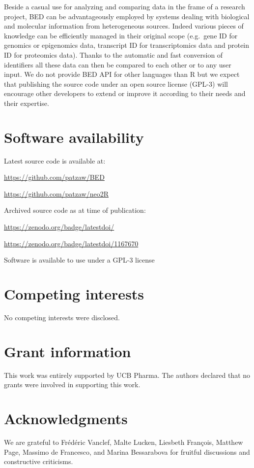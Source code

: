 \documentclass[9pt,a4paper,]{extarticle}
\theoremstyle{definition}
\theoremstyle{definition}
\theoremstyle{definition}
\theoremstyle{remark}
\begin{document}
Beside a casual use for analyzing and comparing data in the frame of a
research project, BED can be advantageously employed by systems dealing with
biological and molecular information from heterogeneous sources.
Indeed various pieces of knowledge can be efficiently managed
in their original scope
(e.g.~gene ID for genomics or epigenomics data, transcript ID
for transcriptomics data and protein ID for proteomics data).
Thanks to the automatic and fast conversion of identifiers all these
data can then be compared to each other or to any user input.
We do not provide BED API for other languages than R but we expect that
publishing the source code under an open source license (GPL-3)
will encourage other developers to extend or improve it according to their
needs and their expertise.

\section{Software availability}\label{software-availability}

Latest source code is available at:

\url{https://github.com/patzaw/BED}

\url{https://github.com/patzaw/neo2R}

Archived source code as at time of publication:

\url{https://zenodo.org/badge/latestdoi/}

\url{https://zenodo.org/badge/latestdoi/1167670} \citep{godard_patzaw/neo2r:_2018}

Software is available to use under a GPL-3 license

\section{Competing interests}\label{competing-interests}

No competing interests were disclosed.

\section{Grant information}\label{grant-information}

This work was entirely supported by UCB Pharma.
The authors declared that no grants were involved in supporting this work.

\section{Acknowledgments}\label{acknowledgments}

We are grateful to Frédéric Vanclef, Malte Lucken, Liesbeth François,
Matthew Page,
Massimo de Francesco, and Marina Bessarabova for fruitful discussions
and constructive criticisms.

{\small}
\end{document}
